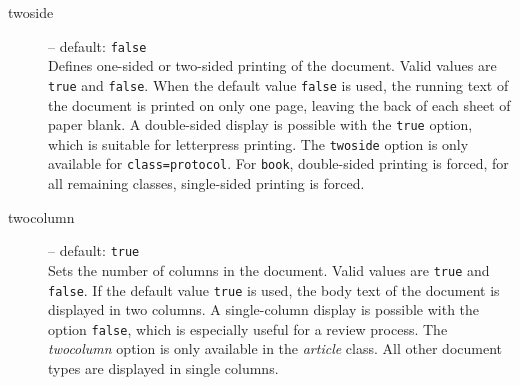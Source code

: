 \begin{description}
	\item[twoside] -- default: \texttt{false} \\
	Defines one-sided or two-sided printing of the document. Valid values are \texttt{true} and \texttt{false}. When the default value \texttt{false} is used, the running text of the document is printed on only one page, leaving the back of each sheet of paper blank. A double-sided display is possible with the \texttt{true} option, which is suitable for letterpress printing. The \texttt{twoside} option is only available for \texttt{class=protocol}. For \texttt{book}, double-sided printing is forced, for all remaining classes, single-sided printing is forced.
	
	\item[twocolumn] -- default: \texttt{true} \\
	Sets the number of columns in the document. Valid values are \texttt{true} and \texttt{false}. If the default value \texttt{true} is used, the body text of the document is displayed in two columns. A single-column display is possible with the option \texttt{false}, which is especially useful for a review process. The \textit{twocolumn} option is only available in the \textit{article} class. All other document types are displayed in single columns.
	
	
	
	

\end{description}
